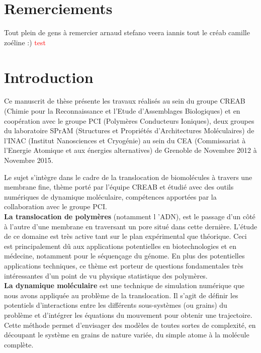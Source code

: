 \section*{Remerciements}

Tout plein de gens à remercier
arnaud stefano veera iannis tout le créab camille zoéline :)
\textcolor{red}{test}

\newpage

\section*{Introduction}

Ce manuscrit de thèse présente les travaux réalisés au sein du groupe CREAB (Chimie pour la Reconnaissance et l’Etude d’Assemblages Biologiques) et en coopération avec le groupe PCI (Polymères Conducteurs Ioniques), deux groupes du laboratoire SPrAM (Structures et Propriétés d'Architectures Moléculaires) de l'INAC (Institut Nanosciences et Cryogénie) au sein du CEA (Commissariat à l'Energie Atomique et aux énergies alternatives) de Grenoble de Novembre 2012 à Novembre 2015.

Le sujet s'intègre dans le cadre de la translocation de biomolécules à travers une membrane fine, thème porté par l'équipe CREAB et étudié avec des outils numériques de dynamique moléculaire, compétences apportées par la collaboration avec le groupe PCI. \\

\textbf{La translocation de polymères} (notamment l 'ADN), est le passage d'un c\^{o}té à l'autre d'une membrane en traversant un pore situé dans cette dernière. L'étude de ce domaine est très active tant sur le plan expérimental que théorique. Ceci est principalement d\^{u} aux applications potentielles en biotechnologies et en médecine, notamment pour le séquençage du génome. En plus des potentielles applications techniques, ce thème est porteur de questions fondamentales très intéressantes d'un point de vu physique statistique des polymères.\\

\textbf{La dynamique moléculaire} est une technique de simulation numérique que nous avons appliquée au problème de la translocation. Il s'agit de définir les potentiels d’interactions entre les différents sous-systèmes (ou grains) du problème et d'intégrer les équations du mouvement pour obtenir une trajectoire. Cette méthode permet d'envisager des modèles de toutes sortes de complexité, en découpant le système en grains de nature variée, du simple atome à la molécule complète.\\

